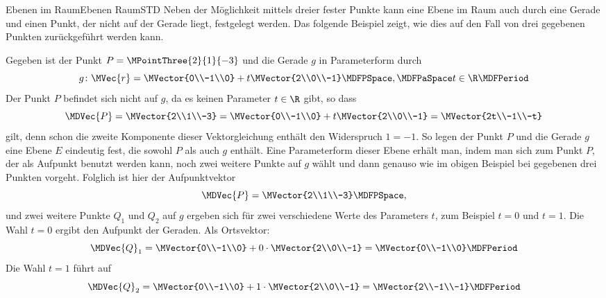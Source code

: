 \begin{MXContent}{Ebenen im Raum}{Ebenen Raum}{STD}
Neben der Möglichkeit mittels dreier fester Punkte kann eine Ebene im Raum auch durch eine Gerade und einen Punkt, der nicht auf der Gerade liegt, festgelegt werden. Das folgende Beispiel zeigt, wie dies auf den Fall von drei gegebenen Punkten zurückgeführt werden kann.  

\begin{MExample}
Gegeben ist der Punkt $P=\MPointThree{2}{1}{-3}$ und die Gerade $g$ in Parameterform durch
\[
 g\colon \MVec{r}=\MVector{0\\-1\\0}+t\MVector{2\\0\\-1}\MDFPSpace,\MDFPaSpace t\in\R \MDFPeriod
\]
Der Punkt $P$ befindet sich nicht auf $g$, da es keinen Parameter $t\in\R$ gibt, so dass
\[
 \MDVec{P}=\MVector{2\\1\\-3}=\MVector{0\\-1\\0}+t\MVector{2\\0\\-1}=\MVector{2t\\-1\\-t}
\]
gilt, denn schon die zweite Komponente dieser Vektorgleichung enthält den Widerspruch $1=-1$. So legen der Punkt $P$ und die Gerade $g$ eine Ebene $E$ eindeutig fest, die sowohl $P$ als auch $g$ enthält. Eine Parameterform dieser Ebene erhält man, indem man sich zum Punkt $P$, der als Aufpunkt benutzt werden kann, noch zwei weitere Punkte auf $g$ wählt und dann genauso wie im obigen Beispiel bei gegebenen drei Punkten vorgeht. Folglich ist hier der Aufpunktvektor
\[
 \MDVec{P}=\MVector{2\\1\\-3} \MDFPSpace,
\]
und zwei weitere Punkte $Q_1$ und $Q_2$ auf $g$ ergeben sich für zwei verschiedene Werte des Parameters $t$, zum Beispiel $t=0$ und $t=1$. Die Wahl $t=0$ ergibt den Aufpunkt der Geraden. Als Ortsvektor:
\[
 \MDVec{Q}_1=\MVector{0\\-1\\0}+0\cdot\MVector{2\\0\\-1}=\MVector{0\\-1\\0} \MDFPeriod
\]
Die Wahl $t=1$ führt auf
\[
 \MDVec{Q}_2=\MVector{0\\-1\\0}+1\cdot\MVector{2\\0\\-1}=\MVector{2\\-1\\-1} \MDFPeriod
\]
\end{MExample}
\end{MXContent}
